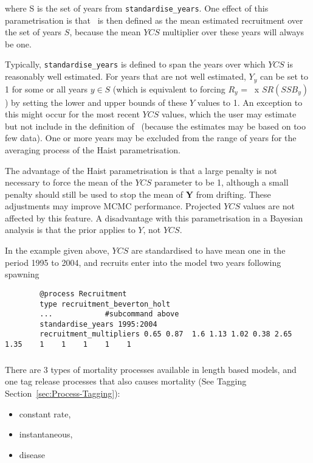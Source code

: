 where S is the set of years from \texttt{standardise\_years}. One effect of this parametrisation is that \Rzero\ is then defined as the mean estimated recruitment over the set of years $S$, because the mean $YCS$ multiplier over these years will always be one.

Typically, \texttt{standardise\_years} is defined to span the years over which $YCS$ is reasonably well estimated. For years that are not well estimated, $Y_y$ can be set to 1 for some or all years $y\in S$ (which is equivalent to forcing $R_y$ = \Rzero\ x $SR(SSB_y)$) by setting the lower and upper bounds of these $Y$ values to 1. An exception to this might occur for the most recent $YCS$ values, which the user may estimate but not include in the definition of \Rzero\ (because the estimates may be based on too few data). One or more years may be excluded from the range of years for the averaging process of the Haist parametrisation.

The advantage of the Haist parametrisation is that a large penalty is not necessary to force the mean of the $YCS$ parameter to be 1, although a small penalty should still be used to stop the mean of \textbf{Y} from drifting. These adjustments may improve MCMC performance. Projected $YCS$ values are not affected by this feature. A disadvantage with this parametrisation in a Bayesian analysis is that the prior applies to $Y$, not $YCS$.

In the  example given above, $YCS$ are standardised to have mean one in the period 1995 to 2004, and recruits enter into the model two years following spawning

{\small{\begin{verbatim}
		@process Recruitment
		type recruitment_beverton_holt
		...            #subcommand above
		standardise_years 1995:2004
		recruitment_multipliers 0.65 0.87  1.6 1.13 1.02 0.38 2.65 1.35    1    1    1    1    1
		\end{verbatim}}}


\subsubsection{\label{sec:Process-Mortality}}

There are 3 types of mortality processes available in \CNAME length based models, and one tag release processes that also causes mortality (See Tagging Section~\ref{sec:Process-Tagging}):

\begin{itemize}
	\item constant rate,
	\item instantaneous,
	\item disease
\end{itemize}

